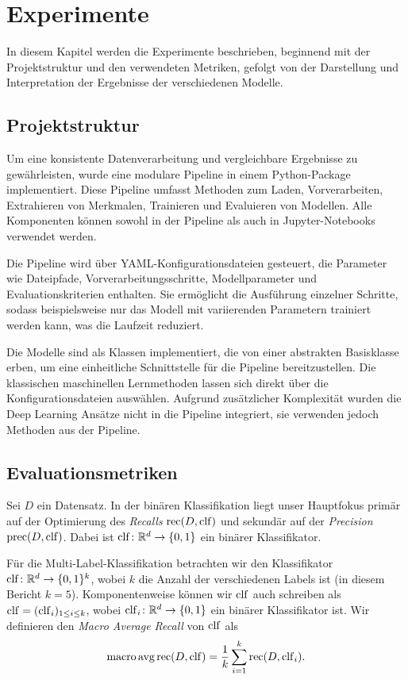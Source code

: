 \section{Experimente}
In diesem Kapitel werden die Experimente beschrieben, beginnend mit der Projektstruktur und den verwendeten Metriken, gefolgt von der Darstellung und Interpretation der Ergebnisse der verschiedenen Modelle.

\subsection{Projektstruktur}
\label{sec:projektstruktur}
Um eine konsistente Datenverarbeitung und vergleichbare Ergebnisse zu gewährleisten, wurde eine modulare Pipeline in einem Python-Package implementiert. Diese Pipeline umfasst Methoden zum Laden, Vorverarbeiten, Extrahieren von Merkmalen, Trainieren und Evaluieren von Modellen. Alle Komponenten können sowohl in der Pipeline als auch in Jupyter-Notebooks verwendet werden.

Die Pipeline wird über YAML-Konfigurationsdateien gesteuert, die Parameter wie Dateipfade, Vorverarbeitungsschritte, Modellparameter und Evaluationskriterien enthalten. Sie ermöglicht die Ausführung einzelner Schritte, sodass beispielsweise nur das Modell mit variierenden Parametern trainiert werden kann, was die Laufzeit reduziert.

Die Modelle sind als Klassen implementiert, die von einer abstrakten Basisklasse erben, um eine einheitliche Schnittstelle für die Pipeline bereitzustellen. Die klassischen maschinellen Lernmethoden lassen sich direkt über die Konfigurationsdateien auswählen. Aufgrund zusätzlicher Komplexität wurden die Deep Learning Ansätze nicht in die Pipeline integriert, sie verwenden jedoch Methoden aus der Pipeline.

\subsection{Evaluationsmetriken}
\label{sec:evaluationsmetriken}
Sei $D$ ein Datensatz. In der binären Klassifikation liegt unser Hauptfokus primär auf der Optimierung des \textit{Recalls} $\operatorname{rec}(D, \operatorname{clf})$ und sekundär auf der \textit{Precision} $\operatorname{prec}(D, \operatorname{clf})$. Dabei ist $\operatorname{clf}\colon\mathbb{R}^d\to \{0, 1\}$ ein binärer Klassifikator.

Für die Multi-Label-Klassifikation betrachten wir den Klassifikator $\operatorname{clf}\colon\mathbb{R}^d\to\{0, 1\}^k$, wobei $k$ die Anzahl der verschiedenen Labels ist (in diesem Bericht $k=5$). Komponentenweise können wir $\operatorname{clf}$ auch schreiben als $\operatorname{clf} = (\operatorname{clf}_i)_{1\leq i\leq k}$, wobei $\operatorname{clf}_i\colon\mathbb{R}^d\to\{0, 1\}$ ein binärer Klassifikator ist. Wir definieren den \textit{Macro Average Recall} von $\operatorname{clf}$ als
\begin{equation*}
    \operatorname{macro\,avg\,rec}(D, \operatorname{clf}) = \frac{1}{k}\sum_{i=1}^k\operatorname{rec} (D, \operatorname{clf}_i).
\end{equation*}


